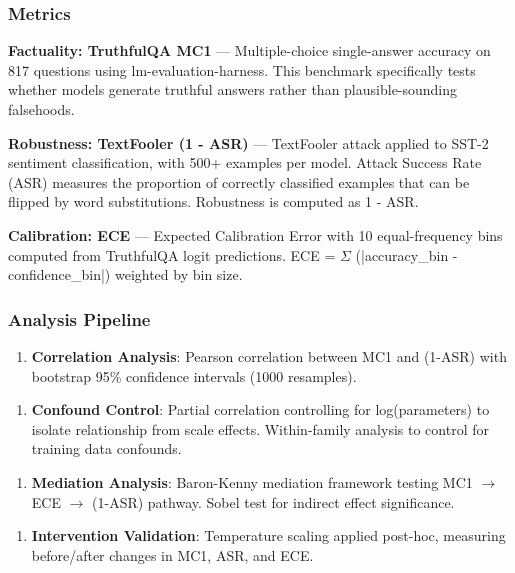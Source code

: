 \subsubsection{Metrics}

\textbf{Factuality: TruthfulQA MC1} --- Multiple-choice single-answer accuracy on 817 questions using lm-evaluation-harness. This benchmark specifically tests whether models generate truthful answers rather than plausible-sounding falsehoods.

\textbf{Robustness: TextFooler (1 - ASR)} --- TextFooler attack applied to SST-2 sentiment classification, with 500+ examples per model. Attack Success Rate (ASR) measures the proportion of correctly classified examples that can be flipped by word substitutions. Robustness is computed as 1 - ASR.

\textbf{Calibration: ECE} --- Expected Calibration Error with 10 equal-frequency bins computed from TruthfulQA logit predictions. ECE = $\Sigma$ (|accuracy\_bin - confidence\_bin|) weighted by bin size.

\subsubsection{Analysis Pipeline}

\begin{enumerate}
\item \textbf{Correlation Analysis}: Pearson correlation between MC1 and (1-ASR) with bootstrap 95\% confidence intervals (1000 resamples).
\end{enumerate}

\begin{enumerate}
\item \textbf{Confound Control}: Partial correlation controlling for log(parameters) to isolate relationship from scale effects. Within-family analysis to control for training data confounds.
\end{enumerate}

\begin{enumerate}
\item \textbf{Mediation Analysis}: Baron-Kenny mediation framework testing MC1 $\rightarrow$ ECE $\rightarrow$ (1-ASR) pathway. Sobel test for indirect effect significance.
\end{enumerate}

\begin{enumerate}
\item \textbf{Intervention Validation}: Temperature scaling applied post-hoc, measuring before/after changes in MC1, ASR, and ECE.
\end{enumerate}

